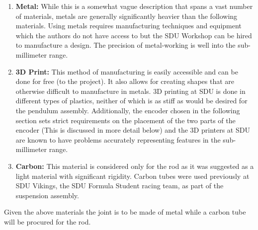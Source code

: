 \begin{enumerate}
	\item \textbf{Metal:} While this is a somewhat vague description that spans a vast number of materials, metals are generally significantly heavier than the following materials.
	Using metals requires manufacturing techniques and equipment which the authors do not have access to but the SDU Workshop can be hired to manufacture a design.
	The precision of metal-working is well into the sub-millimeter range.
	\item \textbf{3D Print:} This method of manufacturing is easily accessible and can be done for free (to the project). 
	It also allows for creating shapes that are otherwise difficult to manufacture in metals.
	3D printing at SDU is done in different types of plastics, neither of which is as stiff as would be desired for the pendulum assembly.
	Additionally, the encoder chosen in the following section sets strict requirements on the placement of the two parts of the encoder (This is discussed in more detail below) and the 3D printers at SDU are known to have problems accurately representing features in the sub-millimeter range.
	\item \textbf{Carbon:} This material is considered only for the rod as it was suggested as a light material with significant rigidity.
	Carbon tubes were used previously at SDU Vikings, the SDU Formula Student racing team, as part of the suspension assembly.
\end{enumerate}
Given the above materials the joint is to be made of metal while a carbon tube will be procured for the rod.

